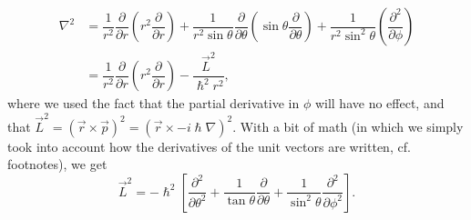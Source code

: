 \begin{eqnarray*}
 \nabla^2 &=  \dfrac{1}{r^2} \dfrac{\partial}{\partial r} \left( r^2 \dfrac{\partial}{\partial r} \right) + \dfrac{1}{r^2 \sin \theta} \dfrac{\partial}{\partial \theta}  \left( \sin \theta \dfrac{\partial}{\partial \theta} \right) + \dfrac{1}{r^2 \sin^2 \theta}   \left( \dfrac{\partial^2}{\partial \phi}  \right) \\ 
    & =  \dfrac{1}{r^2} \dfrac{\partial}{\partial r} \left(r^2 \dfrac{\partial}{\partial r} \right) - \dfrac{\vec{L}^2}{\hslash^2 r^2},
\end{eqnarray*}
where we used the fact that the partial derivative in $\phi$ will have no effect, and that $\vec{L}^2 = (\vec{r} \times \vec{p})^2 = (\vec{r} \times  -i\hslash \nabla)^2$. With a bit of math (in which we simply took into account how the derivatives of the unit vectors are written, cf. footnotes), we get
\begin{equation}\label{eq:ellequadro}\vec{L}^2 = -\hslash^2\left [ \dfrac{\partial^2}{\partial \theta^2} + \dfrac{1}{\tan \theta} \dfrac{\partial}{\partial \theta} + \dfrac{1}{\sin^2 \theta}\dfrac{\partial^2}{\partial \phi^2}  \right ].\end{equation}
 
